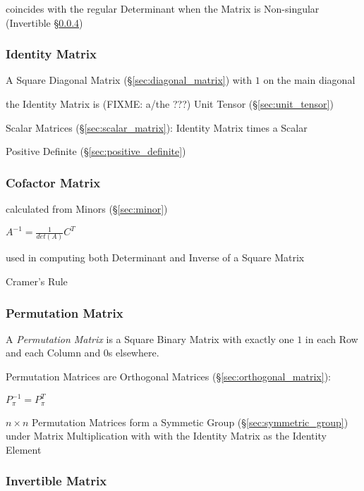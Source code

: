 coincides with the regular Determinant when the Matrix is Non-singular
(Invertible \S\ref{sec:invertible_matrix})



\subsubsection{Identity Matrix}\label{sec:identity_matrix}

A Square Diagonal Matrix (\S\ref{sec:diagonal_matrix}) with $1$ on the main
diagonal

the Identity Matrix is (FIXME: a/the ???) Unit Tensor (\S\ref{sec:unit_tensor})

Scalar Matrices (\S\ref{sec:scalar_matrix}): Identity Matrix times a Scalar

Positive Definite (\S\ref{sec:positive_definite})



\subsubsection{Cofactor Matrix}\label{sec:cofactor_matrix}

calculated from Minors (\S\ref{sec:minor})

$A^{-1} = \frac{1}{det(A)}C^T$

used in computing both Determinant and Inverse of a Square Matrix

Cramer's Rule



\subsubsection{Permutation Matrix}\label{sec:permutation_matrix}

A \emph{Permutation Matrix} is a Square Binary Matrix with exactly one
$1$ in each Row and each Column and $0$s elsewhere.

Permutation Matrices are Orthogonal Matrices (\S\ref{sec:orthogonal_matrix}):

$P_\pi^{-1} = P_\pi^T$

$n \times n$ Permutation Matrices form a Symmetic Group
(\S\ref{sec:symmetric_group}) under Matrix Multiplication with
with the Identity Matrix as the Identity Element



\subsubsection{Invertible Matrix}\label{sec:invertible_matrix}

